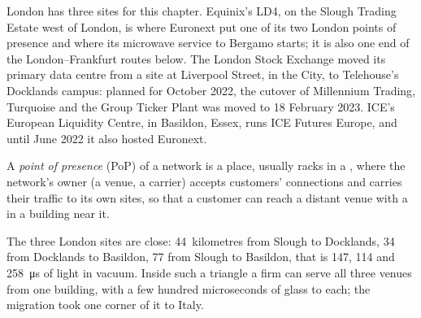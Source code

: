 London has three sites for this chapter. Equinix's LD4, on the Slough Trading Estate west of London, is where Euronext put one of its two
London points of presence and where its microwave service to Bergamo starts; it is also one end of the London--Frankfurt routes below. The
London Stock Exchange moved its primary data centre from a site at Liverpool Street, in the City, to Telehouse's Docklands campus: planned
for October 2022, the cutover of Millennium Trading, Turquoise and the Group Ticker Plant was moved to 18 February 2023. ICE's European
Liquidity Centre, in Basildon, Essex, runs ICE Futures Europe, and until June 2022 it also hosted Euronext.

\begin{definition}\label{def:nw:the-european-map:pop}
A \emph{point of presence} (PoP) of a network is a place, usually racks in a , where the
network's owner (a venue, a carrier) accepts customers' connections and carries their traffic to its own sites, so that a customer
can reach a distant venue with a  in a building near it.
\end{definition}

The three London sites are close: 44~kilometres from Slough to Docklands, 34 from Docklands to Basildon, 77 from Slough to Basildon, that
is 147, 114 and \qty{258}{\micro\second} of light in vacuum. Inside such a triangle a firm can serve all three venues from
one building, with a few hundred microseconds of glass to each; the migration took one corner of it to Italy.

